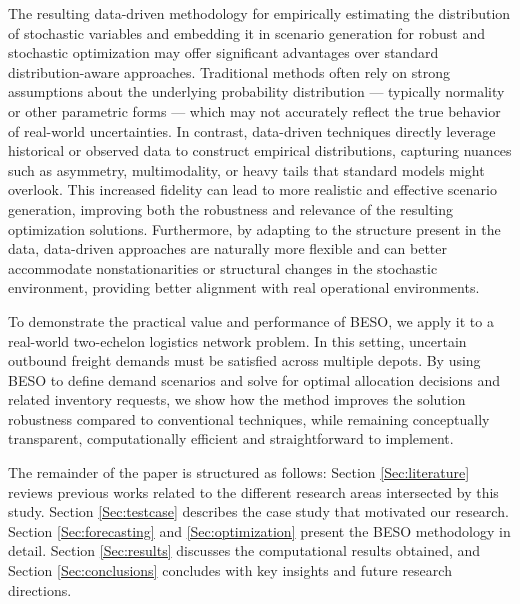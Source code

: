 \documentclass{itor}
\begin{document}
The resulting data-driven methodology for empirically estimating the distribution of stochastic variables and embedding it in scenario generation for robust and stochastic optimization may offer significant advantages over standard distribution-aware approaches. Traditional methods often rely on strong assumptions about the underlying probability distribution — typically normality or other parametric forms — which may not accurately reflect the true behavior of real-world uncertainties. In contrast, data-driven techniques directly leverage historical or observed data to construct empirical distributions, capturing nuances such as asymmetry, multimodality, or heavy tails that standard models might overlook. This increased fidelity can lead to more realistic and effective scenario generation, improving both the robustness and relevance of the resulting optimization solutions. Furthermore, by adapting to the structure present in the data, data-driven approaches are naturally more flexible and can better accommodate nonstationarities or structural changes in the stochastic environment, providing better alignment with real operational environments.


To demonstrate the practical value and performance of BESO, we apply it to a real-world two-echelon logistics network problem. In this setting, uncertain outbound freight demands must be satisfied across multiple depots. By using BESO to define demand scenarios and solve for optimal allocation decisions and related inventory requests, we show how the method improves the solution robustness compared to conventional techniques, while remaining conceptually transparent, computationally efficient and straightforward to implement.

The remainder of the paper is structured as follows: Section \ref{Sec:literature} reviews previous works related to the different research areas intersected by this study. Section \ref{Sec:testcase} describes the case study that motivated our research. Section \ref{Sec:forecasting} and \ref{Sec:optimization} present the BESO methodology in detail.  Section \ref{Sec:results} discusses the computational results obtained, and Section \ref{Sec:conclusions} concludes with key insights and future research directions.
\end{document}

